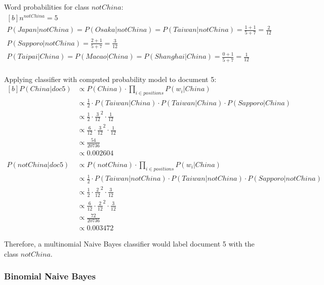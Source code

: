 \documentclass{article}
\begin{document}
Word probabilities for class $notChina$:
\begin{equation}
\begin{aligned}[b]
n^{notChina} = 5 \\
P(Japan|notChina) = P(Osaka|notChina) = P(Taiwan|notChina) = \frac{1 + 1}{5 + 7} = \frac{2}{12} \\
P(Sapporo|notChina) = \frac{2 + 1}{5 + 7} = \frac{3}{12} \\
P(Taipai|China) = P(Macao|China) = P(Shanghai|China) = \frac{0 + 1}{5 + 7} = \frac{1}{12} \\
\end{aligned}
\end{equation}

Applying classifier with computed probability model to document 5:
\begin{equation}
\begin{aligned}[b]
	P(China|doc5) & \propto P(China) \cdot \prod_{i \in positions} {P(w_i|China)} \\
	& \propto \frac{1}{2} \cdot P(Taiwan|China) \cdot P(Taiwan|China) \cdot P(Sapporo|China) \\
	& \propto \frac{1}{2} \cdot \frac{3}{12}^2 \cdot \frac{1}{12} \\
	& \propto \frac{6}{12} \cdot \frac{3}{12}^2 \cdot \frac{1}{12} \\
	& \propto \frac{54}{20736} \\
	& \propto 0.002604 \\
	& \nonumber \\ 
	P(notChina|doc5) & \propto P(notChina) \cdot \prod_{i \in positions} {P(w_i|China)} \\
	& \propto \frac{1}{2} \cdot P(Taiwan|notChina) \cdot P(Taiwan|notChina) \cdot P(Sapporo|notChina) \\
	& \propto \frac{1}{2} \cdot \frac{2}{12}^2 \cdot \frac{3}{12} \\
	& \propto \frac{6}{12} \cdot \frac{2}{12}^2 \cdot \frac{3}{12} \\	
	& \propto \frac{72}{20736} \\
	& \propto 0.003472
\end{aligned}
\end{equation}

Therefore, a multinomial Naive Bayes classifier would label document 5 with the class $notChina$.

\subsubsection{Binomial Naive Bayes}
\end{document}
